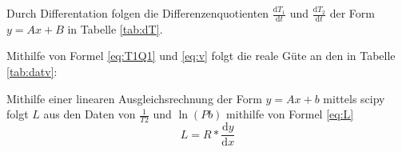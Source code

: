Durch Differentation folgen die Differenzenquotienten $\frac{\text{d}T_1}{\text{d}t}$ und $\frac{\text{d}T_2}{\text{d}t}$ der Form $y = Ax+B$ in Tabelle \ref{tab:dT}.

Mithilfe von Formel \ref{eq:T1Q1} und \ref{eq:v} folgt die reale Güte an den in Tabelle \ref{tab:datv}:

\begin{table}
  \centering
  \label{tab:datv}
\end{table}
Mithilfe einer linearen Ausgleichsrechnung der Form $y=Ax+b$ mittels scipy folgt
$L$ aus den Daten von $\frac{1}{T2}$ und $\ln(Pb)$ mithilfe von Formel \ref{eq:L}
 \begin{equation}
   L = R*\frac{\text{d}y}{\text{d}x}\label{eq:L}
 \end{equation}
\begin{table}
  \centering
  \label{tab:datm}
\end{table}

\begin{table}
  \centering
  \label{tab:datn}
\end{table}
